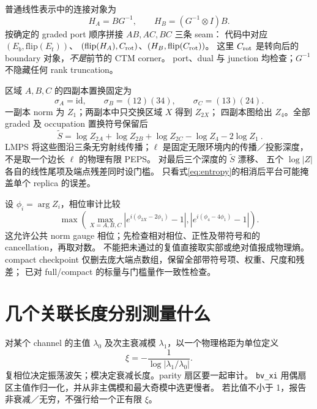 \documentclass[11pt]{article}
\newcommand{\tS}{\widetilde S}
\newcommand{\code}[1]{{\small\texttt{#1}}}
\begin{document}
普通线性表示中的连接对象为
\begin{equation}
 H_A=BG^{-1},\qquad H_B=(G^{-1}\otimes I)B.
\end{equation}
按确定的 graded port 顺序拼接 $AB,AC,BC$ 三条 seam：
代码中对应 $(E_b,\mathrm{flip}(E_t))$、
$(\mathrm{flip}(H_A),C_{\rm rot})$、$(H_B,\mathrm{flip}(C_{\rm rot}))$。
这里 $C_{\rm rot}$ 是转向后的 boundary 对象，\emph{不是}前节的 CTM corner。
port、dual 与 junction 均检查；$G^{-1}$ 不隐藏任何 rank truncation。

区域 $A,B,C$ 的四副本置换固定为
\begin{equation}
 \sigma_A=\mathrm{id},\qquad \sigma_B=(12)(34),\qquad \sigma_C=(13)(24).
\end{equation}
一副本 norm 为 $Z_1$；两副本中只交换区域 $X$ 得到 $Z_{2X}$；
四副本图给出 $Z_4$。全部 graded 及 occupation 置换符号保留后
\begin{equation}
 \boxed{\ \tS=\log Z_{2A}+\log Z_{2B}+\log Z_{2C}-\log Z_4-2\log Z_1\ }.
 \label{eq:entropy}
\end{equation}
LMPS 将这些图沿三条无穷射线传播；$\ell$ 是固定无限环境内的传播／投影深度，
不是取一个边长 $\ell$ 的物理有限 PEPS。
 对最后三个深度的 $\tS$ 漂移、
五个 $\log|Z|$ 各自的线性尾项及端点残差同时设门槛。
只看式\eqref{eq:entropy}的相消后平台可能掩盖单个 replica 的误差。

设 $\phi_i=\arg Z_i$，相位审计比较
\begin{equation}
 \max\left(\max_{X=A,B,C}|e^{i(\phi_{2X}-2\phi_1)}-1|,
 |e^{i(\phi_4-4\phi_1)}-1|\right).
\end{equation}
这允许公共 norm gauge 相位；先检查相对相位、正性及带符号和的 cancellation，再取对数。
不能把未通过的复值直接取实部或绝对值报成物理熵。
compact checkpoint 仅删去庞大端点数组，保留全部带符号项、权重、尺度和残差；
已对 full/compact 的标量与门槛量作一致性检查。

\section{几个关联长度分别测量什么}
\label{sec:xi}
对某个 channel 的主值 $\lambda_0$ 及次主衰减模 $\lambda_1$，以一个物理格距为单位定义
\begin{equation}
 \xi=-\frac{1}{\log|\lambda_1/\lambda_0|}.
 \label{eq:xi}
\end{equation}
复相位决定振荡波矢；模决定衰减长度。parity 扇区要一起审计。
\code{bv\_xi} 用偶扇区主值作归一化，并从非主偶模和最大奇模中选更慢者。
若比值不小于 1，报告非衰减／无穷，不强行给一个正有限 $\xi$。
\end{document}
